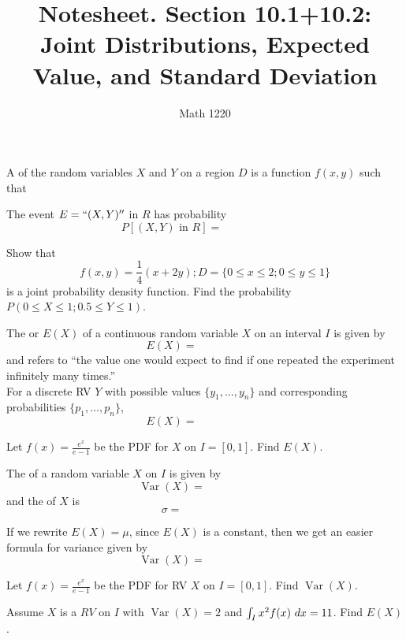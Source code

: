 \documentclass[12pt, a4paper]{article}
\author{Math 1220}
\title{Notesheet. Section 10.1+10.2: Joint Distributions, Expected
  Value, and Standard Deviation}
\date{}
\newcommand{\Var}{\operatorname{Var}}
\begin{document}
\maketitle
\nameline
\vspace{-0.3in}
\begin{defi}
  A  of the random variables
  \(X\) and \(Y\) on a region \(D\) is a function \(f(x,y)\) such that
\end{defi}
\begin{thrm}
  The event \(E = ``(X,Y)''\) in \(R\) has probability \[
    P[(X,Y) \text{ in } R] = \hspace{1in}
  \]
\end{thrm}
\vspace{-0.5in}
\begin{ex}
  Show that \[
    f(x,y) = \frac{1}{4}(x+2y); D = \{0 \leq x \leq 2; 0 \leq y \leq 1\}
  \]
  is a joint probability density function. Find the probability \(P(0
  \leq X \leq 1; 0.5 \leq Y \leq 1)\).
\end{ex}
\begin{defi}
  The  or  \(E(X)\) of a continuous random variable
  \(X\) on an interval \(I\) is given by \[
    E(X) = \hspace{1in}
  \]
  \vspace{0.1in}
  and refers to ``the value one would expect to find if one repeated
  the experiment infinitely many times.'' \\

  For a discrete RV \(Y\) with possible values \(\{y_1,\ldots, y_n\}\)
  and corresponding probabilities \(\{p_1, \ldots, p_n\}\), \[
    E(X) = \hspace{1in}
  \]
\end{defi}
\vspace{-0.5in}
\begin{ex}
  Let \(f(x) = \frac{e^x}{e-1}\)  be the PDF for \(X\) on
  \(I=[0,1]\). Find \(E(X)\).
\end{ex}
\begin{defi}
  The  of a random variable \(X\) on \(I\) is given by \[
    \Var(X) = \hspace{1in}
  \]
  and the  of \(X\) is \[
    \sigma = \hspace{1in}
  \]
\end{defi}
\vspace{-0.75in}
\begin{rmk}
  If we rewrite \(E(X) = \mu\), since \(E(X)\) is a constant, then we
  get an easier formula for variance given by \[
    \Var(X) = \hspace{1in}
  \]
\end{rmk}
\begin{ex}
  Let \(f(x) = \frac{e^x}{e-1}\)  be the PDF for RV \(X\) on
  \(I=[0,1]\). Find \(\Var(X)\).
\end{ex}
\begin{ex}
  Assume \(X\) is a \(RV\) on \(I\) with \(\Var(X) = 2\) and \(\int_I
  x^2 f(x) \ d x = 11\). Find \(E(X)\).
\end{ex}
\end{document}
